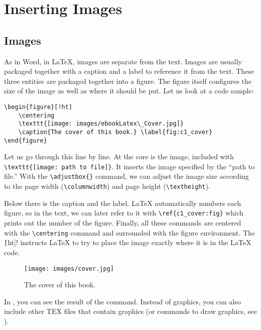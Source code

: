 \chapter{Inserting Images}\label{cha:c2_secondchapter}

\section{Images}\label{sec:c1_images}

As in Word, in \LaTeX{}, images are separate from the text. Images are usually
packaged together with a caption and a label to reference it from the text.
These three entities are packaged together into a figure. The figure itself
configures the size of the image as well as where it should be put. Let us look
at a code sample:
\begin{lstlisting}[language=Tex]
\begin{figure}[!ht]
    \centering
    \texttt{[image: images/ebookLatex\_Cover.jpg]}
    \caption{The cover of this book.} \label{fig:c1_cover}
\end{figure}
\end{lstlisting}

Let us go through this line by line. At the core is the image, included with
\lstinline[language=Tex]!\texttt{[image: path to file]}!. It inserts the image
specified by the ``path to file.'' With the
\lstinline[language=Tex]!\adjustbox{}! command, we can adjust the image size
according to the page width (\lstinline[language=Tex]!\columnwidth!) and page
height (\lstinline[language=Tex]!\textheight!). 

Below there is the caption and the label. \LaTeX{} automatically numbers each
figure, so in the text, we can later refer to it with
\lstinline[language=Tex]!\ref{c1_cover:fig}! which prints out the number of the
figure. Finally, all these commands are centered with the
\lstinline[language=Tex]!\centering! command and surrounded with the figure
environment. The \lstinline[language=Tex]![!ht]! instructs \LaTeX{} to try to
place the image exactly where it is in the \LaTeX{} code.

\begin{figure}[!ht]
	\centering
	\texttt{[image: images/cover.jpg]}
	\caption{The cover of this book.}\label{fig:c1_cover}
\end{figure}

In , you can see the result of the command. Instead of
graphics, you can also include other TEX files that contain graphics (or
commands to draw graphics, see ).


